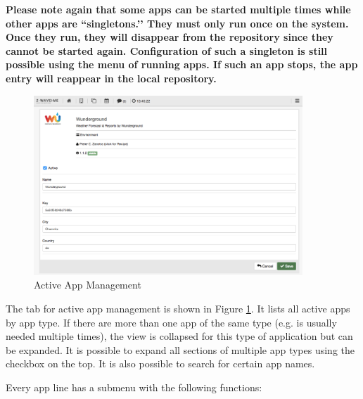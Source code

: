 \textbf{Please note again that some apps can be started multiple times while other 
apps are ``singletons.’’ They must only run once on the system. Once they run, they 
will disappear from the repository since they cannot be started again. Configuration
 of such a singleton is still possible using the menu of running apps. If such an app 
 stops, the app entry will reappear in the local repository.}

\begin{figure}
\begin{center}
\includegraphics[width=0.9\textwidth]{pngs/cap4/app4.png}
\caption{Active App Management}
\label{app4}
\end{center}
\end{figure}

The tab for active app management is shown in Figure \ref{app4}. It lists all active 
apps by app type. If there are more than one app of the same type (e.g.  is 
usually needed multiple times), the view is collapsed for this type of application but 
can be expanded. It is possible to expand all sections of multiple app types using the 
checkbox on the top. It is also possible to search for certain app names.

Every app line has a submenu with the following functions:

